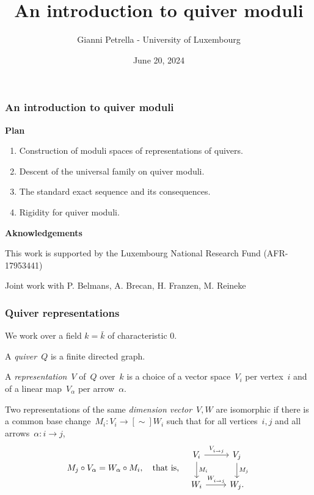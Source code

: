 \documentclass{beamer}
\title{An introduction to quiver moduli}
\institute{Seminar on Nonlinear Algebra - MPI MIS Leipzig}
\author{Gianni Petrella - University of Luxembourg}
\date{June 20, 2024}
\begin{document}
\begin{frame}
    \titlepage
\end{frame}
\begin{frame}
    \frametitle{An introduction to quiver moduli}
{\bf Plan}
    \begin{enumerate}
    \item Construction of moduli spaces of representations of quivers. \pause
    \item Descent of the universal family on quiver moduli. \pause
    \item The standard exact sequence and its consequences. \pause
    \item Rigidity for quiver moduli.
\end{enumerate} \pause
\vfill
{\bf Aknowledgements}

{\small This work is supported by the Luxembourg National Research Fund (AFR-17953441)}

{\small Joint work with P. Belmans, A. Brecan, H. Franzen, M. Reineke}
\end{frame}

\begin{frame}
    \frametitle{Quiver representations}
\begin{definition}
    We work over a field $k = \bar{k}$ of characteristic $0$. \pause

    A \emph{quiver}~$Q$ is a finite directed graph.

    A \emph{representation}~$V$ of~$Q$ over~$k$ is
    a choice of a vector space~$V_i$ per vertex~$i$
    and of a linear map~$V_{\alpha}$ per arrow~$\alpha$.
\end{definition} \pause

Two representations of the same \emph{dimension vector}~$V, W$
are isomorphic if there is a common base change~$M_i : V_i \to[\sim] W_i$
such that for all vertices~$i, j$ and all arrows~$\alpha : i \to j$,
\[M_j \circ V_{\alpha} = W_{\alpha}\circ M_i,~~~\text{that is,}~~~ \begin{tikzcd}[ampersand replacement=\&]
V_i \arrow[r, "V_{i \to j}"] \arrow[d, "M_i"] \& V_j \arrow[d, "M_j"] \\
W_i \arrow[r, "W_{i \to j}"] \& W_j.
\end{tikzcd} \]
\end{frame}
\end{document}
